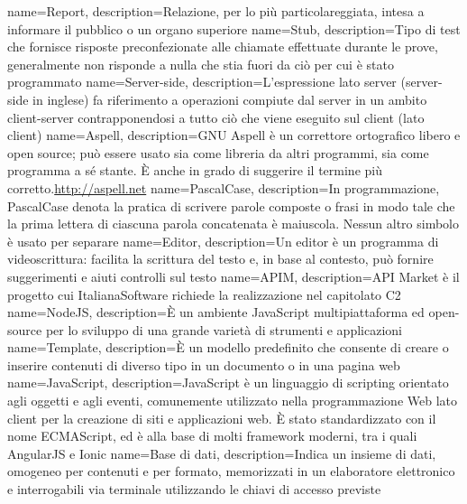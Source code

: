  {
	name=Report,
	description={Relazione, per lo più particolareggiata, intesa a informare il pubblico o un organo superiore}
}
 {
	name=Stub,
	description={Tipo di test che fornisce risposte preconfezionate alle chiamate effettuate durante le prove, generalmente non risponde a nulla che stia fuori da ciò per cui è stato programmato}
}
 {
	name=Server-side,
	description={L'espressione lato server (server-side in inglese) fa riferimento a operazioni compiute dal server in un ambito client-server contrapponendosi a tutto ciò che viene eseguito sul client (lato client)}
}
 {
	name=Aspell,
	description={GNU Aspell è un correttore ortografico libero e open source; può essere usato sia come libreria da altri programmi, sia come programma a sé stante. È anche in grado di suggerire il termine più corretto.\url{http://aspell.net}}
}
 {
	name=PascalCase,
	description={In programmazione, PascalCase denota la pratica di scrivere parole composte o frasi in modo tale che la prima lettera di ciascuna parola concatenata è maiuscola. Nessun altro simbolo è usato per separare}
}
 {
	name=Editor,
	description={Un editor è un programma di videoscrittura: facilita la scrittura del testo e, in base al contesto, può fornire suggerimenti e aiuti controlli sul testo}
}
 {
	name=APIM,
	description={API Market è il progetto cui ItalianaSoftware richiede la realizzazione nel capitolato C2}
}
 {
	name=NodeJS,
	description={È un ambiente JavaScript multipiattaforma ed open-source per lo sviluppo di una grande varietà di strumenti e applicazioni}
}
 {
	name=Template,
	description={È un modello predefinito che consente di creare o inserire contenuti di diverso tipo in un documento o in una pagina web}
}
 {
	name=JavaScript,
	description={JavaScript è un linguaggio di scripting orientato agli oggetti e agli eventi, comunemente utilizzato nella programmazione Web lato client per la creazione di siti e applicazioni web. È stato standardizzato con il nome ECMAScript, ed è alla base di molti framework moderni, tra i quali AngularJS e Ionic}
}
 {
	name=Base di dati,
	description={Indica un insieme di dati, omogeneo per contenuti e per formato, memorizzati in un elaboratore elettronico e interrogabili via terminale utilizzando le chiavi di accesso previste}
}
